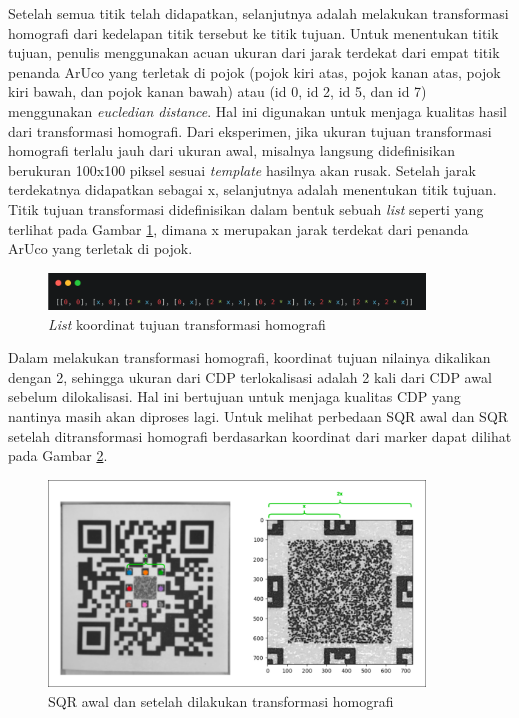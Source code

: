 Setelah semua titik telah didapatkan, selanjutnya adalah melakukan transformasi homografi dari kedelapan titik tersebut ke titik tujuan. Untuk menentukan titik
tujuan, penulis menggunakan acuan ukuran dari jarak terdekat dari empat titik penanda ArUco yang terletak di pojok (pojok kiri atas, pojok kanan atas, pojok
kiri bawah, dan pojok kanan bawah) atau (id 0, id 2, id 5, dan id 7) menggunakan \emph{eucledian distance}. Hal ini digunakan untuk menjaga kualitas hasil dari
transformasi homografi. Dari eksperimen, jika ukuran tujuan transformasi homografi terlalu jauh dari ukuran awal, misalnya langsung didefinisikan berukuran
100x100 piksel sesuai \emph{template} hasilnya akan rusak. Setelah jarak terdekatnya didapatkan sebagai x, selanjutnya adalah menentukan titik tujuan. Titik
tujuan transformasi didefinisikan dalam bentuk sebuah \emph{list} seperti yang terlihat pada Gambar \ref{Fig: 3-koordinattujuan}, dimana x merupakan jarak
terdekat dari penanda ArUco yang terletak di pojok.

\begin{figure}[h]
	\centering
	\includegraphics[width=10cm]{contents/chapter-3/3-koordinattujuan.png}
	\caption{\emph{List} koordinat tujuan transformasi homografi}
	\label{Fig: 3-koordinattujuan}
\end{figure}

Dalam melakukan transformasi homografi, koordinat tujuan nilainya dikalikan dengan 2, sehingga ukuran dari CDP terlokalisasi adalah 2 kali dari CDP awal
sebelum dilokalisasi. Hal ini bertujuan untuk menjaga kualitas CDP yang nantinya masih akan diproses lagi. Untuk melihat perbedaan SQR awal dan SQR setelah
ditransformasi homografi berdasarkan koordinat dari marker dapat dilihat pada Gambar \ref{Fig: 3-hasillokalisasi}.

\begin{figure}[h]
	\centering
	\includegraphics[width=10cm]{contents/chapter-3/3-hasillokalisasi.png}
	\caption{SQR awal dan setelah dilakukan transformasi homografi}
	\label{Fig: 3-hasillokalisasi}
\end{figure}

